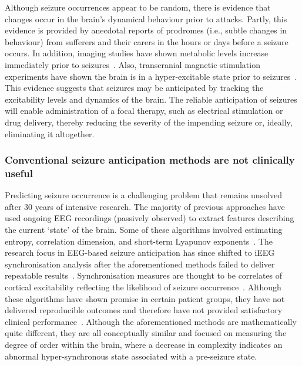 \documentclass[]{article}
\begin{document}
Although seizure occurrences appear to be random, there is evidence that changes occur in the brain’s dynamical behaviour prior to attacks. Partly, this evidence is provided by anecdotal reports of prodromes (i.e., subtle changes in behaviour) from sufferers and their carers in the hours or days before a seizure occurs. In addition, imaging studies have shown metabolic levels increase immediately prior to seizures~\cite{Zhao2007}. Also, transcranial magnetic stimulation experiments have shown the brain is in a hyper-excitable state prior to seizures~\cite{Badawy2009,Wright2006}. This evidence suggests that seizures may be anticipated by tracking the excitability levels and dynamics of the brain. The reliable anticipation of seizures will enable administration of a focal therapy, such as electrical stimulation or drug delivery, thereby reducing the severity of the impending seizure or, ideally, eliminating it altogether. 

\subsubsection{Conventional seizure anticipation methods are not clinically useful}
Predicting seizure occurrence is a challenging problem that remains unsolved after 30 years of intensive research. The majority of previous approaches have used ongoing EEG recordings (passively observed) to extract features describing the current ‘state’ of the brain. Some of these algorithms involved estimating entropy, correlation dimension, and short-term Lyapunov exponents~\cite{Babloyantz1986,Pijn1991,Pritchard1995,Iasemidis1996,LeVanQuyen2001}. 
The research focus in EEG-based seizure anticipation has since shifted to iEEG synchronisation analysis after the aforementioned methods failed to deliver repeatable results~\cite{Lai2003,McSharry2003,Maiwald2004,Lai2004}. Synchronisation measures are thought to be correlates of cortical excitability reflecting the likelihood of seizure occurrence~\cite{Kalitzin2002}. Although these algorithms have shown promise in certain patient groups, they have not delivered reproducible outcomes and therefore have not provided satisfactory clinical performance~\cite{Lehnertz2007,Mormann2007}. 
Although the aforementioned methods are mathematically quite different, they are all conceptually similar and focused on measuring the degree of order within the brain, where a decrease in complexity indicates an abnormal hyper-synchronous state associated with a pre-seizure state. 
\end{document}
